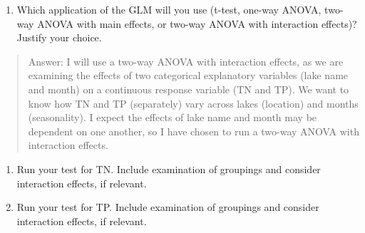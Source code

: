 \documentclass[
]{article}
\newenvironment{Shaded}{\begin{snugshade}}{\end{snugshade}}
\newcommand{\CommentTok}[1]{\textcolor[rgb]{0.56,0.35,0.01}{\textit{#1}}}
\newcommand{\DataTypeTok}[1]{\textcolor[rgb]{0.13,0.29,0.53}{#1}}
\newcommand{\DecValTok}[1]{\textcolor[rgb]{0.00,0.00,0.81}{#1}}
\newcommand{\FloatTok}[1]{\textcolor[rgb]{0.00,0.00,0.81}{#1}}
\newcommand{\KeywordTok}[1]{\textcolor[rgb]{0.13,0.29,0.53}{\textbf{#1}}}
\newcommand{\NormalTok}[1]{#1}
\newcommand{\OperatorTok}[1]{\textcolor[rgb]{0.81,0.36,0.00}{\textbf{#1}}}
\newcommand{\StringTok}[1]{\textcolor[rgb]{0.31,0.60,0.02}{#1}}
\providecommand{\tightlist}{%
  \setlength{\itemsep}{0pt}\setlength{\parskip}{0pt}}
\begin{document}
\begin{enumerate}
\def\labelenumi{\arabic{enumi}.}
\setcounter{enumi}{3}
\tightlist
\item
  Which application of the GLM will you use (t-test, one-way ANOVA,
  two-way ANOVA with main effects, or two-way ANOVA with interaction
  effects)? Justify your choice.
\end{enumerate}

\begin{quote}
Answer: I will use a two-way ANOVA with interaction effects, as we are
examining the effects of two categorical explanatory variables (lake
name and month) on a continuous response variable (TN and TP). We want
to know how TN and TP (separately) vary across lakes (location) and
months (seasonality). I expect the effects of lake name and month may be
dependent on one another, so I have chosen to run a two-way ANOVA with
interaction effects.
\end{quote}

\begin{enumerate}
\def\labelenumi{\arabic{enumi}.}
\setcounter{enumi}{4}
\item
  Run your test for TN. Include examination of groupings and consider
  interaction effects, if relevant.
\item
  Run your test for TP. Include examination of groupings and consider
  interaction effects, if relevant.
\end{enumerate}

\begin{Shaded}
\end{Shaded}
\end{document}
